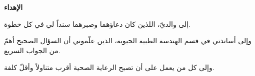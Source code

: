 \chapter*{}
\thispagestyle{plain}
\vspace*{40pt}
\begin{center}
\begin{Arabic}
{\LARGE \textbf{الإهداء}}

\vspace{36pt}
{\large إلى والديّ، اللذين كان دعاؤهما وصبرهما سنداً لي في كل خطوة.}

\vspace{12pt}
{\large وإلى أساتذتي في قسم الهندسة الطبية الحيوية، الذين علّموني أن السؤال الصحيح أهمّ من الجواب السريع.}

\vspace{12pt}
{\large وإلى كل من يعمل على أن تصبح الرعاية الصحية أقرب متناولاً وأقلّ كلفة.}
\end{Arabic}
\end{center}
